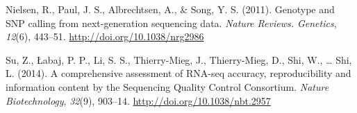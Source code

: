 \documentclass[12pt,twoside]{reedthesis}
\theoremstyle{definition}
\theoremstyle{definition}
\theoremstyle{remark}
\begin{document}
  \hypertarget{ref-Nielsen2011}{}
  Nielsen, R., Paul, J. S., Albrechtsen, A., \& Song, Y. S. (2011).
  Genotype and SNP calling from next-generation sequencing data.
  \emph{Nature Reviews. Genetics}, \emph{12}(6), 443--51.
  \url{http://doi.org/10.1038/nrg2986}
  
  \hypertarget{ref-Su2014}{}
  Su, Z., Łabaj, P. P., Li, S. S., Thierry-Mieg, J., Thierry-Mieg, D.,
  Shi, W., \ldots{} Shi, L. (2014). A comprehensive assessment of RNA-seq
  accuracy, reproducibility and information content by the Sequencing
  Quality Control Consortium. \emph{Nature Biotechnology}, \emph{32}(9),
  903--14. \url{http://doi.org/10.1038/nbt.2957}


\end{document}
